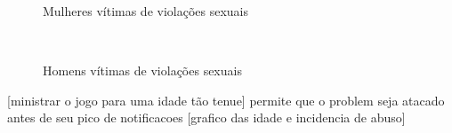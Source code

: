 \begin{figure}[htb]
  \centering
  \begin{minipage}[t]{0.5\textwidth}
      \caption{\label{fig:faixaEtaria1}Mulheres vítimas de violações sexuais}
      \vspace{0.1cm}
      \centering
  \end{minipage}%
  ~ 
  \begin{minipage}[t]{0.5\textwidth}
      \caption{\label{fig:faixaEtaria2}Homens vítimas de violações sexuais}
      \vspace{0.1cm}
      \centering
  \end{minipage}
  \vspace{0.1cm}
\end{figure}


[ministrar o jogo para uma idade tão tenue] permite que o problem seja atacado antes de seu pico de notificacoes [grafico das idade e incidencia de abuso]

